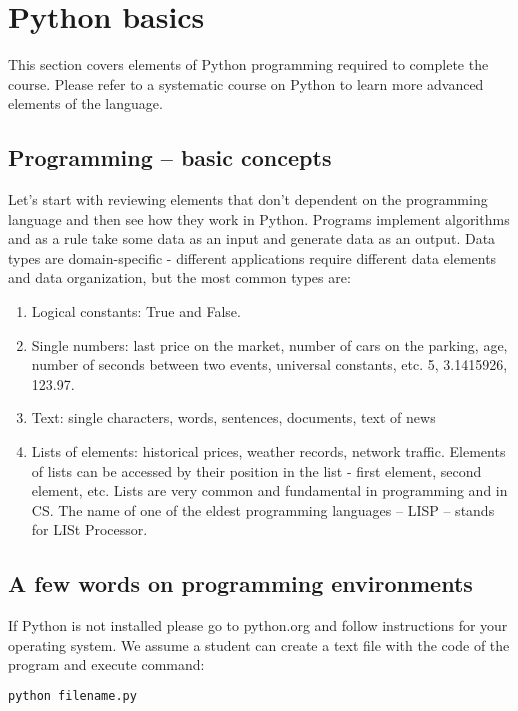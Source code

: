 \chapter{Python basics}

This section covers elements of Python programming required to
complete the course. Please refer to a systematic course on Python
to learn more advanced elements of the language.

\section{Programming -- basic concepts}

Let's start with reviewing elements that don't dependent
on the programming language and then see how they work in
Python. Programs implement algorithms and
as a rule take some data as an input and generate data as an output.
Data types are domain-specific - different applications require
different data elements and
data organization, but the most common types are:

\begin{leftborder}
\begin{enumerate}
\item Logical constants: True and False.
\item Single numbers: last price on the market, number of
cars on the parking, age, number of seconds between two events,
universal constants, etc. 5, 3.1415926, 123.97.
\item Text: single characters, words, sentences, documents, text of news
\item Lists of elements: historical prices, weather records,
network traffic. Elements of lists can be accessed by their
position in the list - first element, second element, etc.
Lists are very common and fundamental in programming and in CS.
The name of one of the eldest programming languages -- LISP --
stands for LISt Processor.
\end{enumerate}
\end{leftborder}

\section{A few words on programming environments}
If Python is not installed please go to python.org and follow
instructions for your operating system.
We assume a student can create a text file with the code of the program
and execute command:

\begin{lstlisting}[language=bash,style=codelst2,caption={Python: runnning program saved in filename.py}]
python filename.py
\end{lstlisting}

